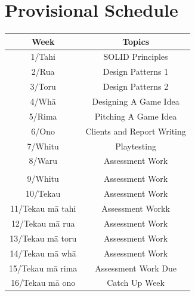 \documentclass{article}
\begin{document}
\section*{Provisional Schedule}
\renewcommand{\arraystretch}{1.5}
\begin{tabular}{|c|c|c|}
	\hline
	\textbf{Week}                  & \multicolumn{2}{c|}{\textbf{Topics}}                                                                                             \\ \hline
	1/Tahi           & \multicolumn{2}{c|}{SOLID Principles}    \\ \hline
	2/Rua            & \multicolumn{2}{c|}{Design Patterns 1}                    \\ \hline
	3/Toru           & \multicolumn{2}{c|}{Design Patterns 2} \\ \hline 
	4/Whā            & \multicolumn{2}{c|}{Designing A Game Idea}                               \\ \hline
	5/Rima           & \multicolumn{2}{c|}{Pitching A Game Idea}                                                \\ \hline
	6/Ono            & \multicolumn{2}{c|}{Clients and Report Writing}                                                   \\ \hline
	7/Whitu          &  \multicolumn{2}{c|}{Playtesting}                            \\ \hline

	8/Waru   & \multicolumn{2}{c|}{Assessment Work}                                                  \\ \hline
	\rowcolor{yellow} \multicolumn{3}{|c|}{Mid Semester Break}                                                                                                                         \\ \hline
	9/Whitu   & \multicolumn{2}{c|}{Assessment Work}                                                  \\ \hline
	10/Tekau         & \multicolumn{2}{c|}{Assessment Work}                                                                 \\ \hline
	11/Tekau mā tahi & \multicolumn{2}{c|}{Assessment Workk}                                                                \\ \hline
	12/Tekau mā rua  & \multicolumn{2}{c|}{Assessment Work}                                                                 \\ \hline
	13/Tekau mā toru & \multicolumn{2}{c|}{Assessment Work}                                                     \\ \hline
	14/Tekau mā whā  & \multicolumn{2}{c|}{Assessment Work} \\ \hline 
	15/Tekau mā rima & \multicolumn{2}{c|}{Assessment Work Due}                                                       \\ \hline
	16/Tekau mā ono  & \multicolumn{2}{c|}{Catch Up Week}                                                         \\ \hline
\end{tabular} 
\end{document}
